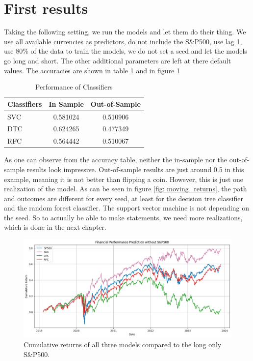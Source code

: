 \section{First results}
\label{First results}
Taking the following setting, we run the models and let them do their thing. We use all available currencies as predictors, do not include the S\&P500, use lag 1, use 80\% of the data to train the models, we do not set a seed and let the models go long and short. The other additional parameters are left at there default values. The accuracies are shown in table \ref{tab: classifier_performance} and in figure \ref{fig: cumulative returns}

\begin{table}[h]
  \centering
  \begin{tabular}{lcc}
    \hline
    Classifiers & In Sample & Out-of-Sample \\
    \hline
    SVC & 0.581024 & 0.510906 \\
    DTC & 0.624265 & 0.477349 \\
    RFC & 0.564442 & 0.510067 \\
    \hline
  \end{tabular}
  \caption{Performance of Classifiers}
  \label{tab: classifier_performance}
\end{table}

\noindent As one can observe from the accuracy table, neither the in-sample nor the out-of-sample results look impressive. Out-of-sample results are just around 0.5 in this example, meaning it is not better than flipping a coin. However, this is just one realization of the model. As can be seen in figure \ref{fig: moving_returns}, the path and outcomes are different for every seed, at least for the decision tree classifier and the random forest classifier. The support vector machine is not depending on the seed. So to actually be able to make statements, we need more realizations, which is done in the next chapter. 

\begin{figure}[h!]
\begin{center}
  \includegraphics[width=\textwidth]{images/first_visualization.png}
  \end{center}
  \caption[Model return comparison]{Cumulative returns of all three models compared to the long only S\&P500.}
  \label{fig: cumulative returns}
\end{figure}



